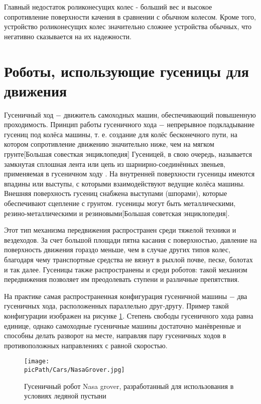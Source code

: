 \documentclass[oneside,final,14pt]{extreport}
\newcommand{\picPath}{img}
\begin{document}
Главный недостаток роликонесущих колес - больший вес и высокое сопротивление поверхности качения в сравнении с обычном колесом. Кроме того, устройство роликонесущих колес значительно сложнее устройства обычных, что негативно сказывается на их надежности.
\section{Роботы, использующие гусеницы для движения}
Гусеничный ход $-$ движитель самоходных машин, обеспечивающий повышенную проходимость. Принцип работы гусеничного хода $-$ непрерывное подкладывание гусениц под колёса машины, т. е. создание для колёс бесконечного пути, на котором сопротивление движению значительно ниже, чем на мягком грунте[Большая совесткая энциклопедия] Гусеницей, в свою очередь, называется замкнутая сплошная лента или цепь из шарнирно-соединённых звеньев, применяемая в гусеничном ходу . На внутренней поверхности гусеницы имеются впадины или выступы, с которыми взаимодействуют ведущие колёса машины. Внешняя поверхность гусениц снабжена выступами (шпорами), которые обеспечивают сцепление с грунтом. гусеницы могут быть металлическими, резино-металлическими и резиновыми[Большая советская энциклопедия].

Этот тип механизма передвижения распространен среди тяжелой техники и вездеходов. За счет большой площади пятна касания с поверхностью, давление на поверхность движения гораздо меньше, чем в случае других типов колес, благодаря чему транспортные средства не вязнут в рыхлой почве, песке, болотах и так далее. Гусеницы также распространены и среди роботов: такой механизм передвижения позволяет им преодолевать ступени и различные препятствия. 

На практике самая распространенная конфигурация гусеничной машины $-$ два гусеничных хода, расположенных параллельно друг-другу. Пример такой конфигурации изображен на рисунке \ref{Figure:NasaGrover}. Степень свободы гусеничного хода равна единице, однако самоходные гусеничные машины достаточно манёвренные и  способны делать разворот на месте, направляя пару гусеничных ходов в противоположных направлениях с равной скоростью.

\begin{figure}[H]
\begin{center}
\texttt{[image: \\picPath/Cars/NasaGrover.jpg]}
\end{center}
  \caption{  Гусеничный робот Nasa grover, разработанный для использования в условиях ледяной пустыни }
  \label{Figure:NasaGrover}
\end{figure}
\end{document}
